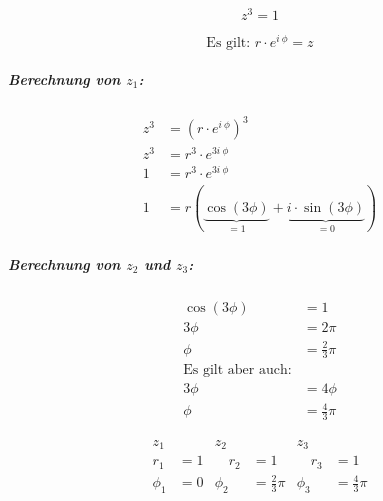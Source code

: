 \begin{uebung}
	\begin{question}
		\[
			z^3 = 1
		\]
	\end{question}
	\begin{solution}
		\[
			\text{Es gilt: }
			r \cdot e^{i\ \phi} = z
		\]

		\subparagraph{Berechnung von \( z_1 \):}


		\begin{align*}
			z^3 & = {\left(r \cdot e^{i\ \phi}\right)}^3                                           \\
			z^3 & = r^3 \cdot e^{3 i\ \phi}                                                        \\
			1   & = r^3 \cdot e^{3 i\ \phi}                                                        \\
			1   & = r(\underbrace{\cos{(3 \phi)}}_{=1} + \underbrace{i \cdot \sin{(3 \phi)}}_{=0})
		\end{align*}

		\subparagraph{Berechnung von \( z_2 \) und \( z_3 \):}

		\[
			\begin{alignedat}{1}
				\cos{(3 \phi)} &= 1 \\
				3 \phi &= 2 \pi \\
				\phi &= \frac{2}{3} \pi \\
				\text{Es gilt aber auch:} \\
				3 \phi &= 4 \phi \\
				\phi &= \frac{4}{3} \pi
			\end{alignedat}
		\]

		\[
			\begin{alignedat}{3}
				z_1    &     & z_2       &                   & z_3       &                   \\
				r_1    & = 1 & \quad r_2 & = 1               & \quad r_3 & = 1               \\
				\phi_1 & = 0 & \phi_2    & = \frac{2}{3} \pi & \phi_3    & = \frac{4}{3} \pi
			\end{alignedat}
		\]
	\end{solution}
\end{uebung}
